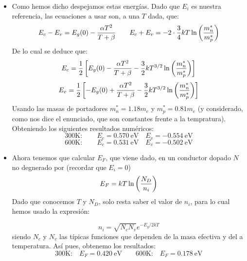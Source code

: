 \begin{itemize}
	\item Como hemos dicho despejamos estas energías. Dado que $E_i$ es nuestra referencia, las ecuaciones a usar son, a una $T$ dada, que:
		  \begin{equation}
			  E_c-E_v = E_g(0) - \frac{\alpha T^2}{T+\beta} \qquad E_c+E_v=-2 \cdot \frac{3}{4} kT\ln \left( \frac{m_n^*}{m_p^*} \right)
		  \end{equation}
		  De lo cual se deduce que:
		  \begin{equation}
			  E_c = \frac{1}{2} \left[ E_g(0) - \frac{\alpha T^2}{T+\beta} - \frac{3}{2} kT^{3/2} \ln \left( \frac{m_n^*}{m_p^*} \right) \right]
		  \end{equation}
		  \begin{equation}
			  E_v = \frac{1}{2} \left[ -E_g(0) +\frac{\alpha T^2}{T+\beta} - \frac{3}{2} kT^{3/2} \ln \left( \frac{m_n^*}{m_p^*} \right) \right]
		  \end{equation}
		  Usando las masas de portadores $m_n^*=1.18m_e$ y $m_p^*=0.81m_e$  (y considerado, como nos dice el enunciado, que son constantes frente a la tempratura). Obteniendo los siguientes resultados numéricos:
		  \begin{equation}
			  \text{300K}: \qquad
			  E_c = 0.570 \ \text{eV} \quad E_v = -0.554 \ \text{eV}
		  \end{equation}
		  \begin{equation}
			  \text{600K}: \qquad
			  E_c = 0.531  \ \text{eV} \quad E_v = -0.502\ \text{eV}
		  \end{equation}
	\item Ahora tenemos que calcular $E_F$, que viene dado, en un conductor dopado $N$ no degnerado por (recordar que $E_i=0$)
		  \begin{equation}
			  E_F = kT \ln \left( \frac{N_D}{n_i} \right)
		  \end{equation}
		  Dado que conocemos $T$ y $N_D$, solo resta saber el valor de $n_i$, para lo cual hemos usado la expresión:

		  \begin{equation}
			  n_i = \sqrt{N_c N_v} e^{-E_g/2kT}
		  \end{equation}
		  siendo $N_c$ y $N_v$ las típicas funciones que dependen de la masa efectiva y del a temperatura. Así pues, obtenemo los resultados:
		  \begin{equation}
			  \text{300K:}\quad
			  E_F = 0.420 \ \text{eV} \qquad
			  \text{600K:}\quad
			  E_F= 0.178 \ \text{eV}
		  \end{equation}
\end{itemize}
